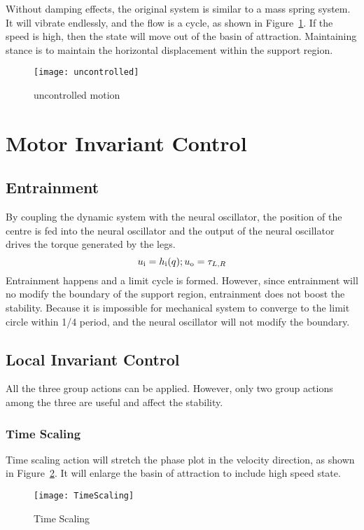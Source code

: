 Without damping effects, the original system is similar to a mass spring system.
It will vibrate endlessly, and the flow is a cycle, as shown in Figure~\ref{fig:stancepostures}.
If the speed is high, then the state will move out of the basin of attraction.
Maintaining stance is to maintain the horizontal displacement within the support region.
\begin{figure}[!htbp]
  \begin{center}
     \texttt{[image: uncontrolled]}
    \caption{uncontrolled motion}
    \label{fig:stancepostures}
\end{center}
\end{figure}



\section {Motor Invariant Control}
\subsection{Entrainment}
By coupling the dynamic system with the neural oscillator, the position of the centre is fed into the neural oscillator and the output of the neural oscillator drives the torque generated by the legs.
\[
u_{\mathrm{i}}=h_{\mathrm{i}}(q);\\
u_{\mathrm{o}}=\tau_{L,R}
\]
Entrainment happens and a limit cycle is formed.
However, since entrainment will no modify the boundary of the support region, entrainment does not boost the stability. 
Because it is impossible for mechanical system to converge to the limit circle within 1/4 period, and the neural oscillator will not modify the boundary.

\subsection{Local Invariant Control}
All the three group actions can be applied.
However, only two group actions among the three are useful and affect the stability.
\subsubsection*{Time Scaling}
Time scaling action will stretch the phase plot in the velocity direction, as shown in Figure~\ref{fig:stanceTimeScaling}.
It will enlarge the basin of attraction to include high speed state.
\begin{figure}[!htbp]
  \begin{center}
      \texttt{[image: TimeScaling]}
    \caption{Time Scaling}
    \label{fig:stanceTimeScaling}
\end{center}
\end{figure}



